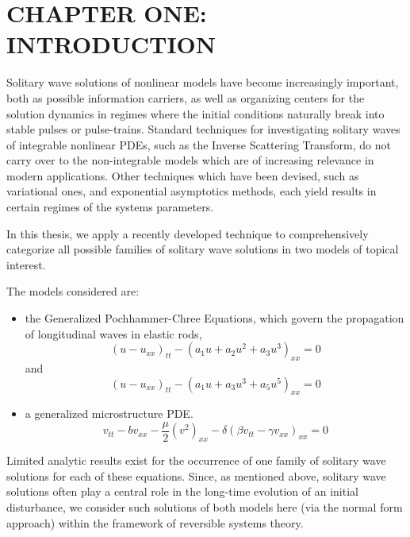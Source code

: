 \chapter{CHAPTER ONE: INTRODUCTION} \label{chapter_1}

Solitary wave solutions of nonlinear models have become increasingly
important, both as possible information carriers,
as well as organizing centers for the solution dynamics in regimes
where the initial conditions naturally break into stable pulses or
pulse-trains. Standard techniques for investigating solitary waves of
integrable nonlinear PDEs,
such as the Inverse Scattering Transform, do not carry over to the
non-integrable models which are of increasing relevance in modern
applications. Other techniques which have been devised, such as
variational ones, and exponential asymptotics methods, each yield
results in certain regimes of the systems parameters.

In this thesis, we apply a recently developed technique to
comprehensively categorize all possible families of solitary wave
solutions in two models of topical interest.

The models considered are:
\begin{itemize}
\item the Generalized Pochhammer-Chree Equations, which  govern the
propagation of longitudinal waves in elastic rods,
\begin{equation}\label{eq:GPC1}
\left( u - u_{xx} \right)_{tt} - \left( a_1 u + a_2 u^2 + a_3 u^3 \right)_{xx} =0  
\end{equation}
and
\begin{equation}  \label{eq:GPC2} 
\left( u - u_{xx} \right)_{tt} - \left( a_1 u + a_3 u^3 + a_5 u^5 \right)_{xx} =0
\end{equation}

\item a generalized microstructure PDE.
\begin{equation}\label{eq:MS}
v_{tt} - b v_{xx} - \frac{\mu}{2} \left( v^2 \right)_{xx} - \delta \left( \beta v_{tt} - \gamma v_{xx}\right)_{xx} = 0 
\end{equation}
\end{itemize}

Limited analytic results exist for the occurrence of one family
of  solitary wave solutions for each of these equations. Since, as
mentioned above, solitary wave solutions often play a central role in
the long-time evolution of an initial disturbance, we consider
such solutions of both models here (via the normal form approach)
within the framework of reversible systems theory.

